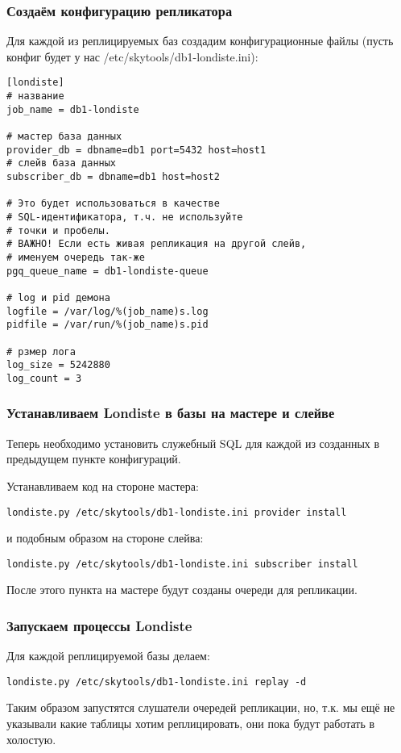 \subsubsection{Создаём конфигурацию репликатора}
Для каждой из реплицируемых баз создадим конфигурационные файлы 
(пусть конфиг будет у нас /etc/skytools/db1-londiste.ini):
\begin{verbatim}
[londiste]
# название
job_name = db1-londiste

# мастер база данных
provider_db = dbname=db1 port=5432 host=host1
# слейв база данных
subscriber_db = dbname=db1 host=host2

# Это будет использоваться в качестве 
# SQL-идентификатора, т.ч. не используйте
# точки и пробелы.
# ВАЖНО! Если есть живая репликация на другой слейв, 
# именуем очередь так-же
pgq_queue_name = db1-londiste-queue

# log и pid демона
logfile = /var/log/%(job_name)s.log
pidfile = /var/run/%(job_name)s.pid

# рзмер лога
log_size = 5242880
log_count = 3
\end{verbatim}

\subsubsection{Устанавливаем Londiste в базы на мастере и слейве}
Теперь необходимо установить служебный SQL для каждой из созданных в предыдущем
пункте конфигураций.

Устанавливаем код на стороне мастера:
\begin{verbatim}
londiste.py /etc/skytools/db1-londiste.ini provider install
\end{verbatim}
и подобным образом на стороне слейва:
\begin{verbatim}
londiste.py /etc/skytools/db1-londiste.ini subscriber install
\end{verbatim}

После этого пункта на мастере будут созданы очереди для репликации.

\subsubsection{Запускаем процессы Londiste}
Для каждой реплицируемой базы делаем:
\begin{verbatim}
londiste.py /etc/skytools/db1-londiste.ini replay -d
\end{verbatim}

Таким образом запустятся слушатели очередей репликации, но, т.к. мы ещё не
указывали какие таблицы хотим реплицировать, они пока будут работать в холостую.


